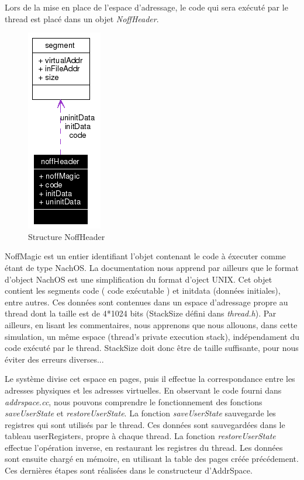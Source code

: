 \documentclass[a4paper,10pt]{article}
\begin{document}
\newpage

Lors de la mise en place de l'espace d'adressage, le code qui sera exécuté par le thread est placé dans un objet \textit{NoffHeader}.

\begin{figure}[h]
  \begin{center}
    \includegraphics[scale=0.4]{./structnoff.png}
   \caption{\label{structnoff} Structure NoffHeader}
  \end{center}
\end{figure}

NoffMagic est un entier identifiant l'objet contenant le code à éxecuter comme étant de type NachOS.
La documentation nous apprend par ailleurs que le format d'object NachOS est une simplification du format d'oject UNIX.
Cet objet contient les segments code ( code exécutable ) et initdata (données initiales), entre autres.
Ces données sont contenues dans un espace d'adressage propre au thread dont la taille est de 4*1024 bits (StackSize défini dans \textit{thread.h}).
Par ailleurs, en lisant les commentaires, nous apprenons que nous allouons, dans cette simulation, un même espace (thread's private execution stack),
indépendament du code exécuté par le thread. StackSize doit donc être de taille suffisante, pour nous éviter des erreurs diverses...
\vspace{0.5cm}

Le système divise cet espace en pages, puis il effectue la correspondance entre les adresses physiques et les adresses virtuelles.
En observant le code fourni dans \textit{addrspace.cc}, nous pouvons comprendre le fonctionnement des fonctions \textit{saveUserState} et \textit{restoreUserState}.
La fonction \textit{saveUserState} sauvegarde les registres qui sont utilisés par le thread. Ces données sont sauvegardées dans le tableau userRegisters,
propre à chaque thread. La fonction \textit{restoreUserState} effectue l'opération inverse, en restaurant les registres du thread.
Les données sont ensuite chargé en mémoire, en utilisant la table des pages créée précédement. Ces dernières étapes sont réalisées dans le constructeur d'AddrSpace.
\vspace{0.5cm}
\end{document}
